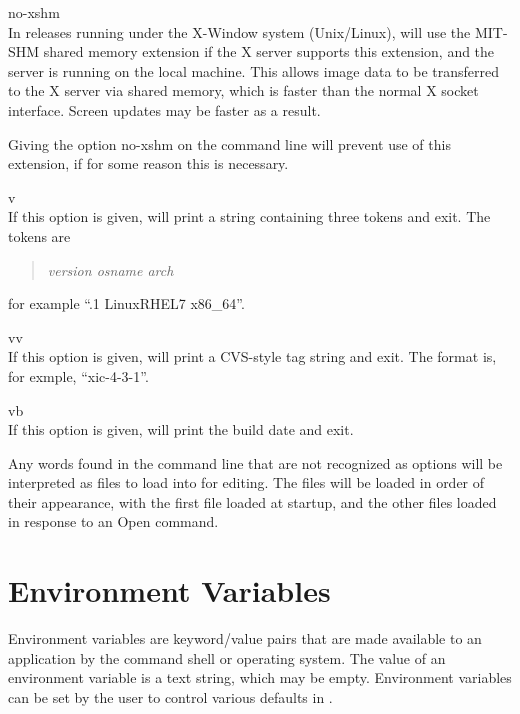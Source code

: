 \begin{description}
\item{\et {}no-xshm}\\
In releases running under the X-Window system (Unix/Linux), {\Xic}
will use the MIT-SHM shared memory extension if the X server supports
this extension, and the server is running on the local machine.  This
allows image data to be transferred to the X server via shared memory,
which is faster than the normal X socket interface.  Screen updates
may be faster as a result.

Giving the option {\et {}no-xshm} on the command
line will prevent use of this extension, if for some reason this is
necessary.

\item{\et {}v}\\
If this option is given, {\Xic} will print a string containing three
tokens and exit.  The tokens are
\begin{quote}
{\it version osname arch}       
\end{quote}
for example ``{.1 LinuxRHEL7 x86\_64}''.

\item{\et {}vv}\\
If this option is given, {\Xic} will print a CVS-style tag string and
exit.  The format is, for exmple, ``{\vt xic-4-3-1}''.

\item{\et {}vb}\\
If this option is given, {\Xic} will print the build date and exit. 
\end{description}

Any words found in the command line that are not recognized as options
will be interpreted as files to load into {\Xic} for editing.  The
files will be loaded in order of their appearance, with the first file
loaded at startup, and the other files loaded in response to an {\cb
Open} command.


\section{{\Xic} Environment Variables}
\label{xicenv}
Environment variables are keyword/value pairs that are made available
to an application by the command shell or operating system.  The value
of an environment variable is a text string, which may be empty. 
Environment variables can be set by the user to control various
defaults in {\Xic}.

